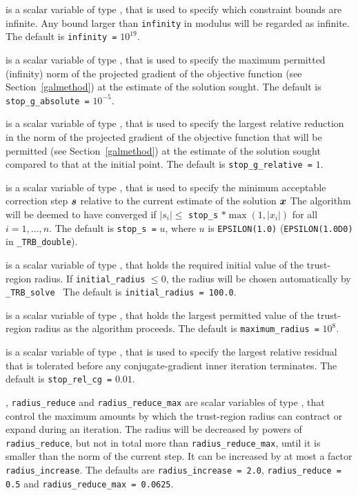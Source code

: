\documentclass{galahad}
\newcommand{\packagename}{TRB}
\newcommand{\fullpackagename}{\libraryname\_\packagename}
\newcommand{\solver}{{\tt \fullpackagename\_solve}}
\begin{document}
\begin{description}
 is a scalar variable of type \realdp, that is used to
specify which constraint bounds are infinite.
Any bound larger than {\tt infinity} in modulus will be regarded as infinite.
The default is {\tt infinity =} $10^{19}$.

 is a scalar variable of type \realdp,
that is used to specify the maximum permitted (infinity)
norm of the projected gradient of the objective function
(see Section~\ref{galmethod}) at the estimate of the solution sought.
The default is {\tt stop\_g\_absolute =} $10^{-5}$.

 is a scalar variable of type \realdp,
that is used to specify the largest relative reduction in the norm of the
projected gradient of the objective function that will be permitted
(see Section~\ref{galmethod}) at the estimate of the solution sought
compared to that at the initial point.
The default is {\tt stop\_g\_relative =} $1$.

 is a scalar variable of type \realdp,
that is used to specify the minimum acceptable correction step ${\bm{s}}$
relative to the current estimate of the solution ${\bm{x}}$
The algorithm will be deemed to have converged if $|s_i| \leq$
{\tt stop\_s} $\ast \max( 1, |x_i|)$ for all $i = 1, \ldots, n$.
The default is {\tt stop\_s =} $u$,
where $u$ is {\tt EPSILON(1.0)} ({\tt EPSILON(1.0D0)} in
{\tt \fullpackagename\_double}).

 is a scalar variable of type \realdp, that holds
the required initial value of the trust-region radius. If
{\tt initial\_radius} $\leq 0$, the radius will be chosen automatically
by \solver\
The default is {\tt initial\_radius = 100.0}.

 is a scalar variable of type \realdp, that holds
the largest permitted value of the trust-region radius as the algorithm
proceeds.
The default is {\tt maximum\_radius =} $10^8$.

 is a scalar variable of type \realdp,
that is used to specify the largest relative residual that is 
tolerated before any conjugate-gradient inner iteration terminates.
The default is {\tt stop\_rel\_cg =} $0.01$.

,
{\tt radius\_reduce} and
{\tt radius\_reduce\_max}
are scalar variables of type \realdp, that
control the maximum amounts by which the trust-region radius can
contract or expand during an iteration. The radius will be decreased by
powers of {\tt radius\_reduce}, but not in total
more than  {\tt radius\_reduce\_max}, until it is smaller than the norm of
the current step.
It can be increased by at most a factor {\tt radius\_increase}.
The defaults are
{\tt radius\_increase = 2.0},
{\tt radius\_reduce = 0.5} and
{\tt radius\_reduce\_max = 0.0625}.


\end{description}
\end{document}
